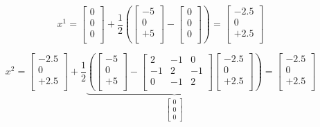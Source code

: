 \documentclass[12pt]{report}
\begin{document}
\begin{equation}
x^1 = \begin{bmatrix}
0  \\
0 \\
0 \\
\end{bmatrix}+ \frac{1}{2} \left(\begin{bmatrix}
-5  \\
0 \\
+5 \\
\end{bmatrix} - \begin{bmatrix}
0  \\
0 \\
0 \\
\end{bmatrix}  \right) = \begin{bmatrix}
-2.5  \\
0 \\
+2.5 \\
\end{bmatrix}
\end{equation}

\begin{equation}
x^2 = \begin{bmatrix}
-2.5  \\
0 \\
+2.5 \\
\end{bmatrix}+ \frac{1}{2} \underbrace{ \left(\begin{bmatrix}
-5  \\
0 \\
+5 \\
\end{bmatrix} - \begin{bmatrix}
2 & -1 & 0  \\
-1 & 2 & -1  \\ 
0 & -1 & 2  \\ 
\end{bmatrix} \begin{bmatrix}
-2.5  \\
0 \\
+2.5 \\
\end{bmatrix}  \right)}_{\begin{bmatrix}
0 \\
0 \\
0
\end{bmatrix}} = \begin{bmatrix}
-2.5  \\
0 \\
+2.5 \\
\end{bmatrix}
\end{equation}
\end{document}
